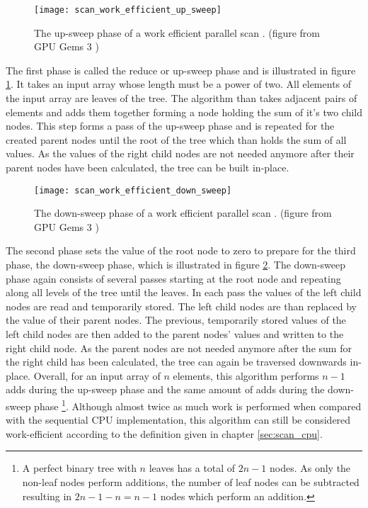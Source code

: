 \begin{figure}
\centering
\texttt{[image: scan\_work\_efficient\_up\_sweep]}
\caption{The up-sweep phase of a work efficient parallel scan \cite{scan_blelloch}.  (figure from GPU Gems 3 \cite{gpu_gems_3_chapter_39})}
\label{fig:scan_work_efficient_up_sweep}
\end{figure}

The first phase is called the reduce or up-sweep phase and is illustrated in figure \ref{fig:scan_work_efficient_up_sweep}. It takes an input array whose length must be a power of two. All elements of the input array are leaves of the tree. The algorithm than takes adjacent pairs of elements and adds them together forming a node holding the sum of it's two child nodes. This step forms a pass of the up-sweep phase and is repeated for the created parent nodes until the root of the tree which than holds the sum of all values. As the values of the right child nodes are not needed anymore after their parent nodes have been calculated, the tree can be built in-place.

\begin{figure}
\centering
\texttt{[image: scan\_work\_efficient\_down\_sweep]}
\caption{The down-sweep phase of a work efficient parallel scan \cite{scan_blelloch}.  (figure from GPU Gems 3 \cite{gpu_gems_3_chapter_39})}
\label{fig:scan_work_efficient_down_sweep}
\end{figure}

The second phase sets the value of the root node to zero to prepare for the third phase, the down-sweep phase, which is illustrated in figure \ref{fig:scan_work_efficient_down_sweep}. The down-sweep phase again consists of several passes starting at the root node and repeating along all levels of the tree until the leaves. In each pass the values of the left child nodes are read and temporarily stored. The left child nodes are than replaced by the value of their parent nodes. The previous, temporarily stored values of the left child nodes are then added to the parent nodes' values and written to the right child node. As the parent nodes are not needed anymore after the sum for the right child has been calculated, the tree can again be traversed downwards in-place.
Overall, for an input array of $n$ elements, this algorithm performs $n - 1$ adds during the up-sweep phase and the same amount of adds during the down-sweep phase \footnote{A perfect binary tree with $n$ leaves has a total of $2n - 1$ nodes. As only the non-leaf nodes perform additions, the number of leaf nodes can be subtracted resulting in $2n - 1 - n = n - 1$ nodes which perform an addition.}. Although almost twice as much work is performed when compared with the sequential CPU implementation, this algorithm can still be considered work-efficient according to the definition given in chapter \ref{sec:scan_cpu}.

